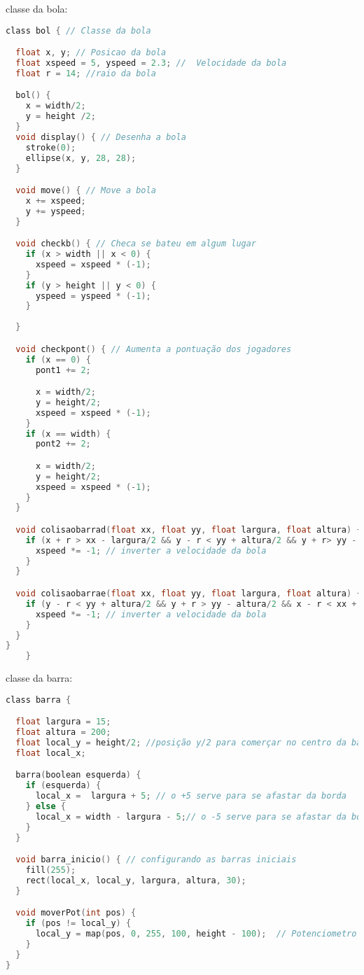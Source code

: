 classe da bola:
    \begin{lstlisting}[language=C]
      class bol { // Classe da bola

  float x, y; // Posicao da bola
  float xspeed = 5, yspeed = 2.3; //  Velocidade da bola
  float r = 14; //raio da bola

  bol() {
    x = width/2;
    y = height /2;
  }
  void display() { // Desenha a bola
    stroke(0);
    ellipse(x, y, 28, 28);
  }

  void move() { // Move a bola
    x += xspeed;
    y += yspeed;
  }

  void checkb() { // Checa se bateu em algum lugar
    if (x > width || x < 0) {
      xspeed = xspeed * (-1);
    }
    if (y > height || y < 0) {
      yspeed = yspeed * (-1);
    }
    
  }

  void checkpont() { // Aumenta a pontuação dos jogadores
    if (x == 0) {
      pont1 += 2;

      x = width/2;
      y = height/2;
      xspeed = xspeed * (-1);
    }
    if (x == width) {
      pont2 += 2;

      x = width/2;
      y = height/2;
      xspeed = xspeed * (-1);
    }
  }

  void colisaobarrad(float xx, float yy, float largura, float altura) {
    if (x + r > xx - largura/2 && y - r < yy + altura/2 && y + r> yy - altura/2) { // condições para a bola recochetear
      xspeed *= -1; // inverter a velocidade da bola
    }
  }

  void colisaobarrae(float xx, float yy, float largura, float altura) {
    if (y - r < yy + altura/2 && y + r > yy - altura/2 && x - r < xx + largura/2) { // condições para a bola recochetear
      xspeed *= -1; // inverter a velocidade da bola
    }
  }
}
    }
     \end{lstlisting}

 classe da barra:
 
 \begin{lstlisting}[language=C]
   class barra {

  float largura = 15;
  float altura = 200;
  float local_y = height/2; //posição y/2 para comerçar no centro da barra
  float local_x;

  barra(boolean esquerda) {
    if (esquerda) {
      local_x =  largura + 5; // o +5 serve para se afastar da borda
    } else {
      local_x = width - largura - 5;// o -5 serve para se afastar da borda
    }
  }

  void barra_inicio() { // configurando as barras iniciais
    fill(255);
    rect(local_x, local_y, largura, altura, 30);
  }

  void moverPot(int pos) {
    if (pos != local_y) {
      local_y = map(pos, 0, 255, 100, height - 100);  // Potenciometro
    }
  }
}
  \end{lstlisting}
